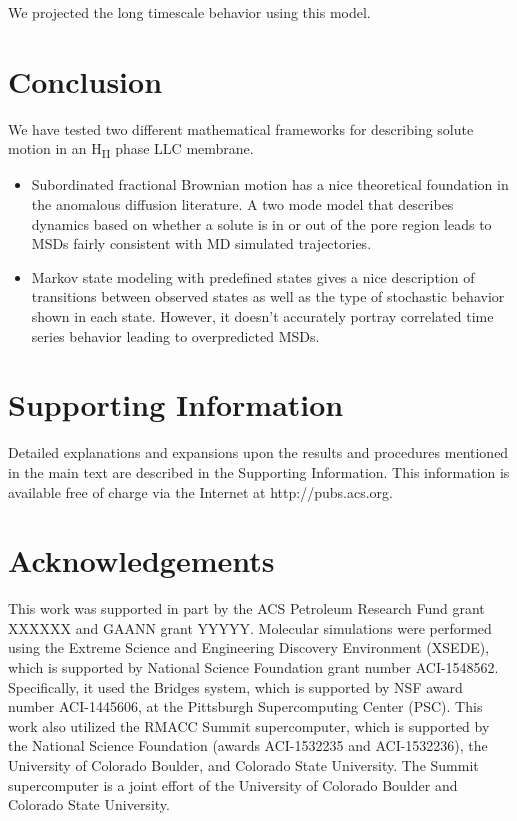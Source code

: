 \documentclass{article}
\begin{document}
  We projected the long timescale behavior using this model. 

  \section{Conclusion}

  
  We have tested two different mathematical frameworks for describing solute
  motion in an H\textsubscript{II} phase LLC membrane.
  \begin{itemize}
    \item Subordinated fractional Brownian motion has a nice theoretical foundation
    in the anomalous diffusion literature. A two mode model that describes dynamics
    based on whether a solute is in or out of the pore region leads to MSDs fairly
    consistent with MD simulated trajectories.
    \item Markov state modeling with predefined states gives a nice description
    of transitions between observed states as well as the type of stochastic 
    behavior shown in each state. However, it doesn't accurately portray correlated
    time series behavior leading to overpredicted MSDs.
  \end{itemize}
  
  \section*{Supporting Information}

  Detailed explanations and expansions upon the results and procedures mentioned in
  the main text are described in the Supporting Information. This information is
  available free of charge via the Internet at http://pubs.acs.org.

  \section*{Acknowledgements}

  This work was supported in part by the ACS Petroleum Research Fund grant XXXXXX and GAANN grant YYYYY.
  Molecular simulations were performed using the Extreme Science and
  Engineering Discovery Environment (XSEDE), which is supported by National
  Science Foundation grant number ACI-1548562. Specifically, it used the Bridges
  system, which is supported by NSF award number ACI-1445606, at the Pittsburgh
  Supercomputing Center (PSC). This work also utilized the RMACC Summit supercomputer,
  which is supported by the National Science Foundation (awards ACI-1532235 and
  ACI-1532236), the University of Colorado Boulder, and Colorado State
  University. The Summit supercomputer is a joint effort of the University of
  Colorado Boulder and Colorado State University.
\end{document}
